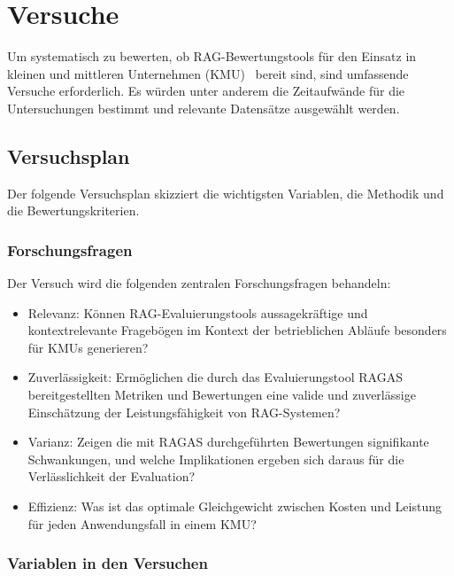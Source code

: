 \chapter{Versuche}

Um systematisch zu bewerten, ob RAG-Bewertungstools für den Einsatz in kleinen und mittleren Unternehmen (KMU)~\cite{esf_kmu_2025} bereit sind, sind umfassende Versuche erforderlich.
Es würden unter anderem die Zeitaufwände für die Untersuchungen bestimmt und relevante Datensätze ausgewählt werden.

\section{Versuchsplan}
Der folgende Versuchsplan skizziert die wichtigsten Variablen, die Methodik und die Bewertungskriterien.

\subsection{Forschungsfragen}

Der Versuch wird die folgenden zentralen Forschungsfragen behandeln:

\begin{itemize}
    \item Relevanz: Können RAG-Evaluierungstools aussagekräftige und kontextrelevante Fragebögen im Kontext der betrieblichen Abläufe besonders für KMUs generieren?
    \item Zuverlässigkeit: Ermöglichen die durch das Evaluierungstool RAGAS bereitgestellten Metriken und Bewertungen eine valide und zuverlässige Einschätzung der Leistungsfähigkeit von RAG-Systemen?
    \item Varianz: Zeigen die mit RAGAS durchgeführten Bewertungen signifikante Schwankungen, und welche Implikationen ergeben sich daraus für die Verlässlichkeit der Evaluation?
    \item Effizienz: Was ist das optimale Gleichgewicht zwischen Kosten und Leistung für jeden Anwendungsfall in einem KMU?
\end{itemize}

\subsection{Variablen in den Versuchen}

